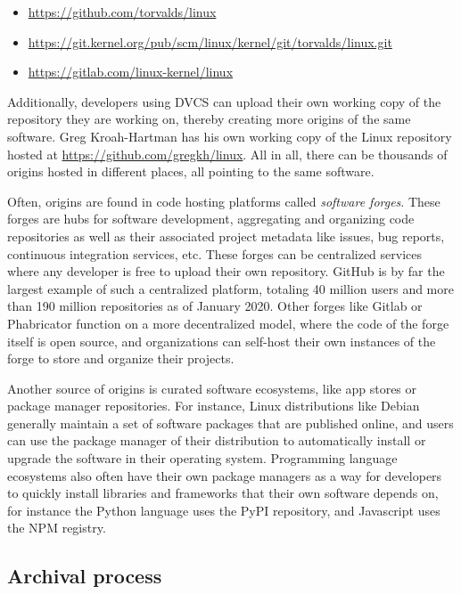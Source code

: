 \begin{itemize}[ ]
    \setlength\itemsep{-0.5em}
    \item \url{https://github.com/torvalds/linux}
    \item \url{https://git.kernel.org/pub/scm/linux/kernel/git/torvalds/linux.git}
    \item \url{https://gitlab.com/linux-kernel/linux}
\end{itemize}

Additionally, developers using \gls{DVCS} can upload their own working copy of
the repository they are working on, thereby creating more origins of the same
software. Greg Kroah-Hartman has his own working copy of the Linux repository
hosted at \url{https://github.com/gregkh/linux}. All in all, there can be
thousands of origins hosted in different places, all pointing to the same
software.

Often, origins are found in code hosting platforms called \emph{software
forges}. These forges are hubs for software development, aggregating and
organizing code repositories as well as their associated project metadata like
issues, bug reports, continuous integration services, etc.
These forges can be centralized services where any developer is free to upload
their own repository. GitHub is by far the largest example of such a
centralized platform, totaling 40 million users and more than 190 million
repositories as of January 2020. Other forges like Gitlab or Phabricator
function on a more decentralized model, where the code of the forge itself is
open source, and organizations can self-host their own instances of the forge
to store and organize their projects.

Another source of origins is curated software ecosystems, like app stores or
package manager repositories. For instance, Linux distributions like Debian
generally maintain a set of software packages that are published online, and
users can use the package manager of their distribution to automatically
install or upgrade the software in their operating system. Programming language
ecosystems also often have their own package managers as a way for developers
to quickly install libraries and frameworks that their own software depends on,
for instance the Python language uses the PyPI repository, and Javascript uses
the NPM registry.

\subsection{Archival process}


